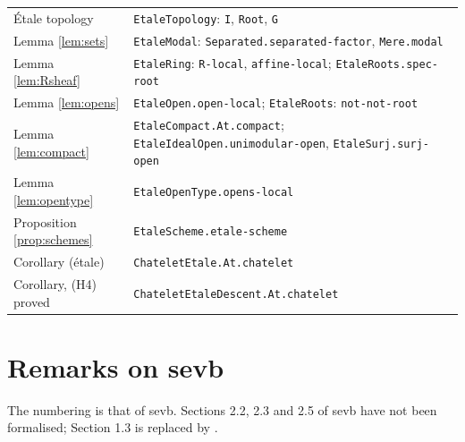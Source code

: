 \documentclass[11pt]{amsart}
\theoremstyle{definition}
\theoremstyle{remark}
\begin{document}
{\begin{longtable}{p{4.6cm}p{8.4cm}}
\'Etale topology & \texttt{EtaleTopology}: \texttt{I}, \texttt{Root},
  \texttt{G}\\
Lemma \ref{lem:sets} & \texttt{EtaleModal}: \texttt{Separated.separated-factor},
  \texttt{Mere.modal}\\
Lemma \ref{lem:Rsheaf} & \texttt{EtaleRing}: \texttt{R-local},
  \texttt{affine-local}; \texttt{EtaleRoots.spec-root}\\
Lemma \ref{lem:opens} & \texttt{EtaleOpen.open-local};
  \texttt{EtaleRoots}: \texttt{not-not-root}\\
Lemma \ref{lem:compact} & \texttt{EtaleCompact.At.compact};
  \texttt{EtaleIdealOpen.unimodular-open}, \texttt{EtaleSurj.surj-open}\\
Lemma \ref{lem:opentype} & \texttt{EtaleOpenType.opens-local}\\
Proposition \ref{prop:schemes} & \texttt{EtaleScheme.etale-scheme}\\
Corollary (\'etale) & \texttt{ChateletEtale.At.chatelet}\\
Corollary, (H4) proved & \texttt{ChateletEtaleDescent.At.chatelet}\\
\end{longtable}
}

\section{Remarks on sevb}
\sloppy

The numbering is that of sevb. Sections 2.2, 2.3 and 2.5 of sevb have
not been formalised; Section 1.3 is replaced by \cite{descent}.
\end{document}

